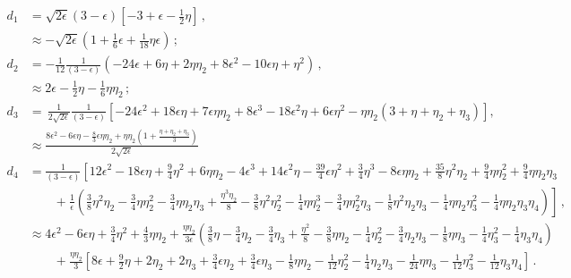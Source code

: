 \documentclass[useAMS,usenatbib,a4paper,onecolumn]{mn2e}
\begin{document}
\begin{align}
\label{eq:Gamma1}
	d_1&=\sqrt{2\epsilon}{(3-\epsilon)}\left[ -3+\epsilon-\frac{1}{2}\eta \right]\, ,\nonumber\\
		& \approx -\sqrt{2\epsilon}\left(1+\frac{1}{6}\epsilon+\frac{1}{18}\eta\epsilon \right)\, ;\\
	d_2&= -\frac{1}{12}\frac{1}{(3-\epsilon)}\left(-24\epsilon+6\eta+2\eta\eta_2+8\epsilon^2 -10\epsilon\eta+\eta^2\right)\, ,\nonumber\\
		&\approx 2\epsilon-\frac{1}{2}\eta-\frac{1}{6}\eta\eta_2\, ;\\
	d_3&=\, \frac{1}{2\sqrt{2\epsilon}} \frac{1}{(3-\epsilon)}\left[ -24\epsilon^2 +18\epsilon\eta +7\epsilon\eta\eta_2+8\epsilon^3-18\epsilon^2\eta+6\epsilon\eta^2-\eta\eta_2\left(3+\eta+\eta_2+\eta_3 \right)\right] ,\nonumber\\
		&\approx \frac{8\epsilon^2-6\epsilon\eta-\frac{8}{3}\epsilon\eta\eta_2+\eta\eta_2\left(1+\frac{\eta+\eta_2+\eta_3}{3} \right)}{2\sqrt{2\epsilon}}\\
	d_4&=\frac{1}{(3-\epsilon)}\left[12\epsilon^2-18\epsilon\eta+\frac{9}{4}\eta^2 +6\eta\eta_2-4\epsilon^3+14\epsilon^2\eta-\frac{39}{4}\epsilon\eta^2   +\frac{3}{4}\eta^3 -8\epsilon\eta\eta_2+\frac{35}{8}\eta^2\eta_2+\frac{9}{4}\eta\eta_2^2+\frac{9}{4}\eta\eta_2\eta_3\right.\nonumber\\
	& \qquad +\frac{1}{\epsilon}\left.\left( \frac{3}{8}\eta^2\eta_2-\frac{3}{4}\eta\eta^2_2-\frac{3}{4}\eta\eta_2\eta_3 +\frac{\eta^3\eta_2}{8}-\frac{3}{8}\eta^2\eta_2^2-\frac{1}{4}\eta\eta_2^3-\frac{3}{4}\eta\eta_2^2\eta_3-\frac{1}{8}\eta^2\eta_2\eta_3-\frac{1}{4}\eta\eta_2\eta_3^2-\frac{1}{4}\eta\eta_2\eta_3\eta_4\right)\right]
	\, , \\
		&\approx 4\epsilon^2-6\epsilon\eta+\frac{3}{4}\eta^2+\frac{4}{3}\eta\eta_2+
		\frac{\eta\eta_2}{3\epsilon}\left( \frac{3}{8}\eta-\frac{3}{4}\eta_2-\frac{3}{4}\eta_3 +\frac{\eta^2}{8}-\frac{3}{8}\eta\eta_2-\frac{1}{4}\eta_2^2-\frac{3}{4}\eta_2\eta_3-\frac{1}{8}\eta\eta_3-\frac{1}{4}\eta_3^2-\frac{1}{4}\eta_3\eta_4\right)\nonumber\\
		&\qquad+\frac{\eta\eta_2}{3}\left[ 8\epsilon+\frac{9}{2}\eta+2\eta_2+2\eta_3+\frac{3}{4}\epsilon\eta_2+\frac{3}{4}\epsilon\eta_3-\frac{1}{8}\eta\eta_2-\frac{1}{12}\eta_2^2-\frac{1}{4}\eta_2\eta_3-\frac{1}{24}\eta\eta_3-\frac{1}{12}\eta_3^2-\frac{1}{12}\eta_3\eta_4
		  \right] \, .
		  \label{eq:d4}%
\end{align}
\end{document}
